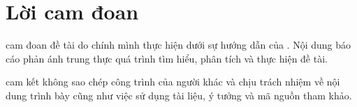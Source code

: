 \section*{Lời cam đoan}
\thispagestyle{empty}

\XungHo{} cam đoan đề tài \textit{\TenDeTai} do chính mình thực hiện dưới sự hướng dẫn của \GiangVien. Nội dung báo cáo phản ánh trung thực quá trình tìm hiểu, phân tích và thực hiện đề tài.

\XungHo{} cam kết không sao chép công trình của người khác và chịu trách nhiệm về nội dung trình bày cũng như việc sử dụng tài liệu, ý tưởng và mã nguồn tham khảo.

\clearpage
